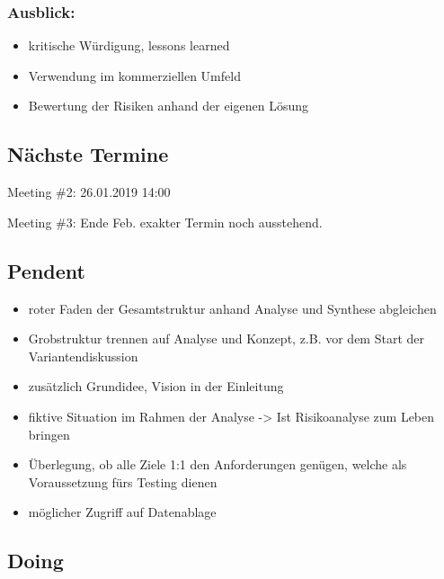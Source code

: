 \documentclass[a4paper,11pt]{article}
\begin{document}
\subsubsection*{Ausblick:}
\label{sec:orga5f61a3}

\begin{itemize}
\item kritische Würdigung, lessons learned
\item Verwendung im kommerziellen Umfeld
\item Bewertung der Risiken anhand der eigenen Lösung
\end{itemize}

\subsection*{Nächste Termine}
\label{sec:org00f1cab}

Meeting \#2: 26.01.2019 14:00

Meeting \#3: Ende Feb. exakter Termin noch ausstehend.

\subsection*{Pendent}
\label{sec:org88ab40d}

\begin{itemize}
\item roter Faden der Gesamtstruktur anhand Analyse und Synthese abgleichen
\item Grobstruktur trennen auf Analyse und Konzept, z.B. vor dem Start der
Variantendiskussion
\item zusätzlich Grundidee, Vision in der Einleitung
\item fiktive Situation im Rahmen der Analyse -> Ist Risikoanalyse zum Leben bringen
\item Überlegung, ob alle Ziele 1:1 den Anforderungen genügen, welche als
Voraussetzung fürs Testing dienen
\item möglicher Zugriff auf Datenablage
\end{itemize}

\subsection*{Doing}
\label{sec:orgb6455fc}
\end{document}
